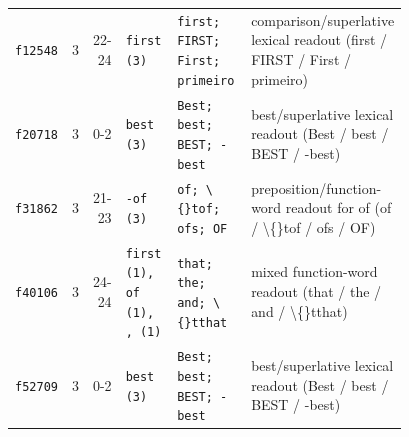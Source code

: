 \begin{table}[p]
\begin{tabular}{@{}lrrp{0.17\linewidth}p{0.25\linewidth}p{0.36\linewidth}@{}}
\texttt{f12548} & 3 & 22-24 & \texttt{first (3)} & \texttt{first; FIRST; First; primeiro} & comparison/superlative lexical readout (first / FIRST / First / primeiro) \\
\texttt{f20718} & 3 & 0-2 & \texttt{best (3)} & \texttt{Best; best; BEST; -best} & best/superlative lexical readout (Best / best / BEST / -best) \\
\texttt{f31862} & 3 & 21-23 & \texttt{-of (3)} & \texttt{of; \textbackslash\{\}tof; ofs; OF} & preposition/function-word readout for of (of / \textbackslash\{\}tof / ofs / OF) \\
\texttt{f40106} & 3 & 24-24 & \texttt{first (1), of (1), , (1)} & \texttt{that; the; and; \textbackslash\{\}tthat} & mixed function-word readout (that / the / and / \textbackslash\{\}tthat) \\
\texttt{f52709} & 3 & 0-2 & \texttt{best (3)} & \texttt{Best; best; BEST; -best} & best/superlative lexical readout (Best / best / BEST / -best) \\
\bottomrule
\end{tabular}
\end{table}
